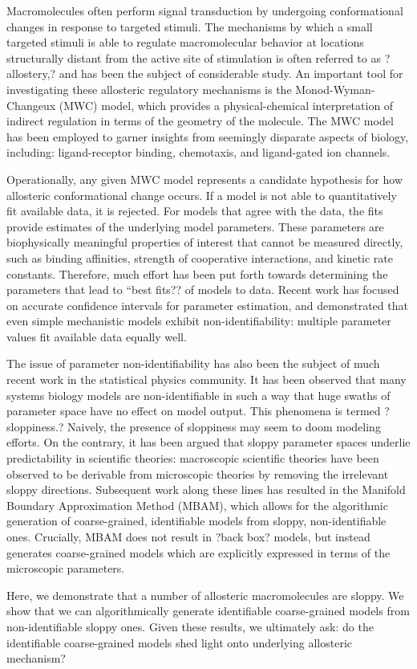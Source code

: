 \documentclass[10pt]{amsart}
\begin{document}
Macromolecules often perform signal transduction by undergoing conformational changes in response to targeted stimuli.  The mechanisms by which a small targeted stimuli is able to regulate macromolecular behavior at locations structurally distant from the active site of stimulation is often referred to as ?allostery,? and has been the subject of considerable study.  An important tool for investigating these allosteric regulatory mechanisms is the Monod-Wyman-Changeux (MWC) model, which provides  a physical-chemical interpretation of indirect regulation in terms of the geometry of the molecule.  The MWC model has been employed to garner insights from seemingly disparate aspects of biology, including: ligand-receptor binding, chemotaxis, and ligand-gated ion channels.



Operationally, any given MWC model represents a candidate hypothesis for how allosteric conformational change occurs.  If a model is not able to quantitatively fit available data, it is rejected.  For models that agree with the data, the fits provide estimates of the underlying model parameters.  These parameters are biophysically meaningful properties of interest that cannot be measured directly, such as binding affinities, strength of cooperative interactions, and kinetic rate constants.  Therefore, much effort has been put forth towards determining the parameters that lead to ``best fits?? of models to data.  Recent work has focused on accurate confidence intervals for parameter estimation, and demonstrated that even simple mechanistic models exhibit non-identifiability: multiple parameter values fit available data equally well.



The issue of parameter non-identifiability has also been the subject of much recent work in the statistical physics community.  It has been observed that many systems biology models are non-identifiable in such a way that huge swaths of parameter space have no effect on model output. This phenomena is termed ?sloppiness.?  Naively, the presence of sloppiness may seem to doom modeling efforts.  On the contrary, it has been argued that sloppy parameter spaces underlie predictability in scientific theories: macroscopic scientific theories have been observed to be derivable from microscopic theories by removing the irrelevant sloppy directions.  Subsequent work along these lines has resulted in the Manifold Boundary Approximation Method (MBAM), which allows for the algorithmic generation of coarse-grained, identifiable models from sloppy, non-identifiable ones.  Crucially, MBAM does not result in ?back box? models, but instead generates coarse-grained models which are explicitly expressed in terms of the microscopic parameters.



Here, we demonstrate that a number of allosteric macromolecules are sloppy.  We show that we can algorithmically generate identifiable coarse-grained models from non-identifiable sloppy ones.  Given these results, we ultimately ask: do the identifiable coarse-grained models shed light onto underlying allosteric mechanism?
\end{document}
